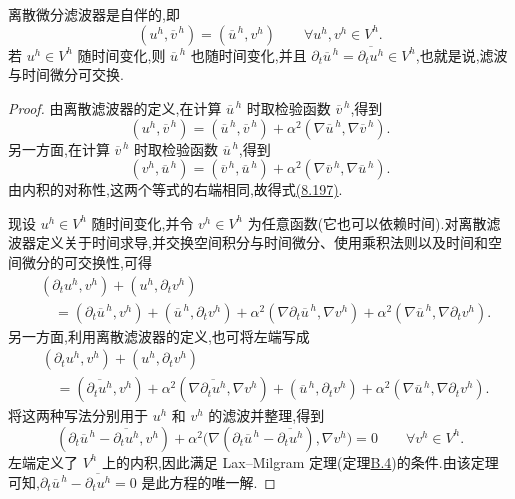 \begin{lemma}[离散微分滤波器的性质]
\label{lem:leray-alpha-discrete-filter-properties}
离散微分滤波器是自伴的,即
\begin{equation}\label{eq:leray-alpha-discrete-filter-self-adjoint}
 (u^h,\overline{v}^{\,h})=(\overline{u}^{\,h},v^h)
 \qquad\forall u^h,v^h\in V^h.
\end{equation}
若 $u^h\in V^h$ 随时间变化,则 $\overline{u}^{\,h}$ 也随时间变化,并且
$\partial_t\overline{u}^{\,h}
=\overline{\partial_t u^h}\in V^h$,也就是说,滤波与时间微分可交换.
\begin{proof}
由离散滤波器的定义,在计算 $\overline{u}^{\,h}$ 时取检验函数 $\overline{v}^{\,h}$,得到
\[
 (u^h,\overline{v}^{\,h})
 =(\overline{u}^{\,h},\overline{v}^{\,h})
  +\alpha^2(\nabla\overline{u}^{\,h},
            \nabla\overline{v}^{\,h}).
\]
另一方面,在计算 $\overline{v}^{\,h}$ 时取检验函数 $\overline{u}^{\,h}$,得到
\[
 (v^h,\overline{u}^{\,h})
 =(\overline{v}^{\,h},\overline{u}^{\,h})
  +\alpha^2(\nabla\overline{v}^{\,h},
            \nabla\overline{u}^{\,h}).
\]
由内积的对称性,这两个等式的右端相同,故得式\hyperref[eq:leray-alpha-discrete-filter-self-adjoint]{(8.197)}.

现设 $u^h\in V^h$ 随时间变化,并令 $v^h\in V^h$ 为任意函数(它也可以依赖时间).对离散滤波器定义关于时间求导,并交换空间积分与时间微分、使用乘积法则以及时间和空间微分的可交换性,可得
\[
\begin{aligned}
 &(\partial_t u^h,v^h)+(u^h,\partial_t v^h)\\
 &\quad=(\partial_t\overline{u}^{\,h},v^h)
       +(\overline{u}^{\,h},\partial_t v^h)
       +\alpha^2(\nabla\partial_t\overline{u}^{\,h},\nabla v^h)
       +\alpha^2(\nabla\overline{u}^{\,h},
                 \nabla\partial_t v^h).
\end{aligned}
\]
另一方面,利用离散滤波器的定义,也可将左端写成
\[
\begin{aligned}
 &(\partial_t u^h,v^h)+(u^h,\partial_t v^h)\\
 &\quad=(\overline{\partial_t u^h},v^h)
       +\alpha^2(\nabla\overline{\partial_t u^h},\nabla v^h)
       +(\overline{u}^{\,h},\partial_t v^h)
       +\alpha^2(\nabla\overline{u}^{\,h},
                 \nabla\partial_t v^h).
\end{aligned}
\]
将这两种写法分别用于 $u^h$ 和 $v^h$ 的滤波并整理,得到
\[
 (\partial_t\overline{u}^{\,h}
   -\overline{\partial_t u^h},v^h)
 +\alpha^2\bigl(\nabla(\partial_t\overline{u}^{\,h}
   -\overline{\partial_t u^h}),\nabla v^h\bigr)=0
 \qquad\forall v^h\in V^h.
\]
左端定义了 $V^h$ 上的内积,因此满足 Lax--Milgram 定理(定理\hyperref[thm:appendix-b-4]{B.4})的条件.由该定理可知,$\partial_t\overline{u}^{\,h}-\overline{\partial_t u^h}=0$ 是此方程的唯一解.
\end{proof}
\end{lemma}

